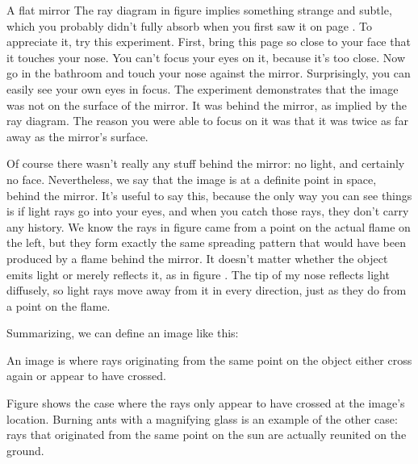 \label{sec:imagelocation}
\begin{envsubsection}{A flat mirror}
The ray diagram in figure  implies something
strange and subtle, which you probably didn't fully absorb when you first
saw it on page \pageref{fig:flatmirrorimage}. To appreciate it, try this
experiment. First, bring this page so close to your face that it touches
your nose. You can't focus your eyes on it, because it's
too close. Now go in the bathroom and touch your nose against the mirror.
Surprisingly, you can easily see your own eyes in focus.
The experiment demonstrates that the image was not on the surface
of the mirror. It was behind the mirror, as implied by the ray diagram.
The reason you were able to focus on it was that it was twice as far away
as the mirror's surface.

Of course there wasn't really any stuff behind the mirror: no light, and
certainly no face. Nevertheless, we say that the image is at a definite
point in space, behind the mirror. It's useful to say this, because the only
way you can see things is if light rays go into your eyes, and when you catch
those rays, they don't carry any history. We know the rays in 
figure  came from a point on the
actual flame on the left, but they form exactly the same spreading pattern
that would have been produced by a flame behind the mirror. It doesn't matter
whether the object emits light or merely reflects it, as in figure .
The tip of my nose reflects light diffusely, so light rays move away from it in every direction,
just as they do from a point on the flame.

Summarizing, we can define an image like this:
\begin{important}
An image is where rays originating from the same point on the object either
cross again or appear to have crossed.
\end{important}
\noindent Figure  shows the case where the rays only appear
to have crossed at the image's location. Burning ants with a magnifying glass
is an example of the other case: rays that originated from the same point
on the sun are actually reunited on the ground.


\end{envsubsection}
